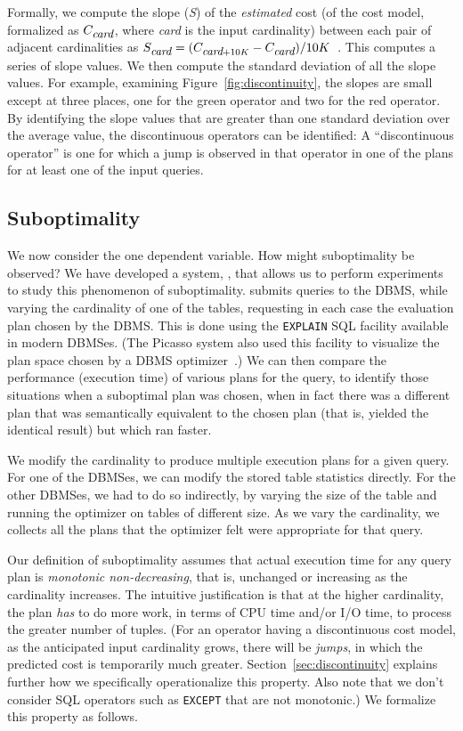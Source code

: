 \documentclass[prodmode,acmtods]{acmsmall}
\def\azdb{\doubleblind{\hbox{\sc AZDBLab}}{\hbox{\sc DBLab}}}
\begin{document}
Formally, we compute the slope ({\em S}) of the {\em estimated} cost
(of the cost model, formalized as $C_{\hbox{\small\em card}}$,
where {\em card} is the input
cardinality) between each pair of adjacent cardinalities as
$S_{\hbox{\small\em card}} = (C_{\hbox{\small\em card} + 10K} -
C_{\hbox{\small\em card}}) / 10K$~.
This computes a series of slope values.
We then compute the standard deviation of all the slope
values.  For example, examining Figure~\ref{fig:discontinuity}, the slopes
are small except at three places, one for the green operator and two for the
red operator. By identifying the slope values that are greater than one
standard deviation over the average value, the discontinuous operators can
be identified: A ``discontinuous operator'' is one for which a jump is
observed in that operator in one of the plans for at least one of the input
queries.

\subsection{Suboptimality}\label{sec:suboptimality}
We now consider the one dependent variable.
How might suboptimality be observed? We have developed a system, \azdb, that
allows us to perform experiments to study this phenomenon of suboptimality.
\hbox{\azdb} submits queries to the \hbox{DBMS}, while varying
the cardinality of one of the tables,
requesting in each case the evaluation plan chosen by the \hbox{DBMS}.
This is done using the
{\tt EXPLAIN} SQL facility available in modern \hbox{DBMSes}. (The Picasso system
also used this facility to visualize the plan space chosen by a \hbox{DBMS}
optimizer~\cite{harish07,Haritsa10}.) We can then compare
the performance (execution time) of various plans for the query, to identify those
situations when a suboptimal plan was chosen, when in fact there was a
different plan that was semantically equivalent to the chosen plan (that is,
yielded the identical result) but which ran faster.

We modify the cardinality to produce multiple execution
plans for a given query. For one of the \hbox{DBMSes}, we can modify the stored
table statistics directly. For the other \hbox{DBMSes}, we had to do so indirectly,
by varying the size of the table and running the optimizer on tables of
different size. As we vary the cardinality, we
collects all the plans that the optimizer felt were appropriate for that
query. 

Our definition of suboptimality assumes that
actual execution time for any query plan is {\em monotonic non-decreasing}, that is,
unchanged or increasing as the cardinality increases.  The intuitive justification is that at the higher
cardinality, the plan {\em has} to do more work, in terms of CPU time and/or
I/O time, to process the greater number of tuples. (For an operator having a discontinuous cost model, as the
anticipated input cardinality grows, there will be {\em jumps}, in which the
predicted cost is temporarily much greater. Section~\ref{sec:discontinuity}
explains further how we specifically
operationalize this property. Also note that we don't consider SQL
operators such as {\tt EXCEPT} that are not monotonic.)
We formalize this property as follows.
\end{document}
